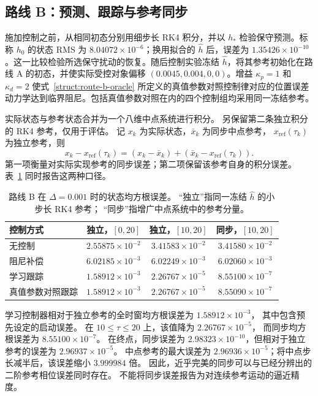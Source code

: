 \subsection{路线 B：预测、跟踪与参考同步}
\label{num:route-b}
施加控制之前，从相同初态分别用细步长 RK4 积分，并以 $h_*$ 检验保守预测。标称 $h_0$ 的状态 RMS 为 $8.04072\times10^{-6}$；换用拟合的 $\widehat h$ 后，误差为 $1.35426\times10^{-10}$。这一比较检验所选保守扰动的恢复。随后控制实验冻结 $\widehat h$，将其参考初始化在路线 A 的初态，并使实际受控对象偏移 $(0.0045,0.004,0,0)$。增益 $\kappa_p=1$ 和 $\kappa_d=2$ 使式~\eqref{struct:route-b-oracle} 所定义的真值参数对照控制律对应的位置误差动力学达到临界阻尼。包括真值参数对照在内的四个控制组均采用同一冻结参考。

实际状态与参考状态合并为一个八维中点系统进行积分。
另保留第二条独立积分的 RK4 参考，仅用于评估。
记 $x_k$ 为实际状态，$\bar x_k$ 为同步中点参考，
$x_{\mathrm{ref}}(\tau_k)$ 为独立参考，则
\begin{equation}
 x_k-x_{\mathrm{ref}}(\tau_k)
 =(x_k-\bar x_k)+
   (\bar x_k-x_{\mathrm{ref}}(\tau_k)).
 \label{num:reference-split}
\end{equation}
第一项衡量对实际实现参考的同步误差；第二项保留该参考自身的积分误差。
表~\ref{num:b-table} 同时报告这两种口径。

\begin{table}[t]
\centering
\caption{路线 B 在 $\Delta=0.001$ 时的状态均方根误差。
“独立”指同一冻结 $\widehat h$ 的小步长 RK4 参考；
“同步”指增广中点系统中的参考分量。}
\label{num:b-table}
\begin{tabular}{lccc}
\toprule
控制方式 & 独立，$[0,20]$ & 独立，$[10,20]$ & 同步，$[10,20]$\\
\midrule
无控制 & $2.55875\times10^{-2}$ & $3.41583\times10^{-2}$ & $3.41580\times10^{-2}$ \\
阻尼补偿 & $6.02185\times10^{-3}$ & $6.02249\times10^{-3}$ & $6.02060\times10^{-3}$ \\
学习跟踪 & $1.58912\times10^{-3}$ & $2.26767\times10^{-5}$ & $8.55100\times10^{-7}$ \\
真值参数对照跟踪 & $1.58912\times10^{-3}$ & $2.26767\times10^{-5}$ & $8.55090\times10^{-7}$ \\
\bottomrule
\end{tabular}
\end{table}

学习控制器相对于独立参考的全时窗均方根误差为 $1.58912\times10^{-3}$，
其中包含预先设定的启动误差。
在 $10\leq\tau\leq20$ 上，该值降为 $2.26767\times10^{-5}$，
而同步均方根误差为 $8.55100\times10^{-7}$。
在终点，同步误差为 $2.98323\times10^{-10}$，但相对于独立参考的误差为 $2.96937\times10^{-5}$。
中点参考的最大误差为 $2.96936\times10^{-5}$；将中点步长减半后，该误差缩小 $3.999984$ 倍。
因此，近乎完美的同步可以与已经分辨出的二阶参考相位误差同时存在。
不能将同步误差报告为对连续参考运动的逼近精度。

